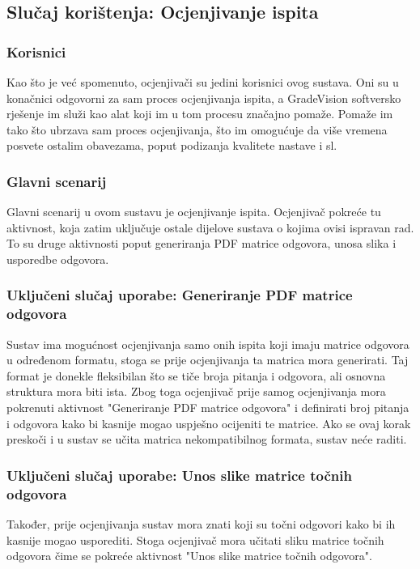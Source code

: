 \documentclass{foi}
\begin{document}
\subsection{Slučaj korištenja: Ocjenjivanje ispita}

\subsubsection{Korisnici}
Kao što je već spomenuto, ocjenjivači su jedini korisnici ovog sustava. Oni su u konačnici odgovorni za sam proces ocjenjivanja ispita, a GradeVision softversko rješenje im služi kao alat koji im u tom procesu značajno pomaže. Pomaže im tako što ubrzava sam proces ocjenjivanja, što im omogućuje da više vremena posvete ostalim obavezama, poput podizanja kvalitete nastave i sl.

\subsubsection{Glavni scenarij}
Glavni scenarij u ovom sustavu je ocjenjivanje ispita. Ocjenjivač pokreće tu aktivnost, koja zatim uključuje ostale dijelove sustava o kojima ovisi ispravan rad. To su druge aktivnosti poput generiranja PDF matrice odgovora, unosa slika i usporedbe odgovora.

\subsubsection{Uključeni slučaj uporabe: Generiranje PDF matrice odgovora}
Sustav ima mogućnost ocjenjivanja samo onih ispita koji imaju matrice odgovora u određenom formatu, stoga se prije ocjenjivanja ta matrica mora generirati. Taj format je donekle fleksibilan što se tiče broja pitanja i odgovora, ali osnovna struktura mora biti ista. Zbog toga ocjenjivač prije samog ocjenjivanja mora pokrenuti aktivnost "Generiranje PDF matrice odgovora" i definirati broj pitanja i odgovora kako bi kasnije mogao uspješno ocijeniti te matrice. Ako se ovaj korak preskoči i u sustav se učita matrica nekompatibilnog formata, sustav neće raditi.

\subsubsection{Uključeni slučaj uporabe: Unos slike matrice točnih odgovora}
Također, prije ocjenjivanja sustav mora znati koji su točni odgovori kako bi ih kasnije mogao usporediti. Stoga ocjenjivač mora učitati sliku matrice točnih odgovora čime se pokreće aktivnost "Unos slike matrice točnih odgovora".
\end{document}
